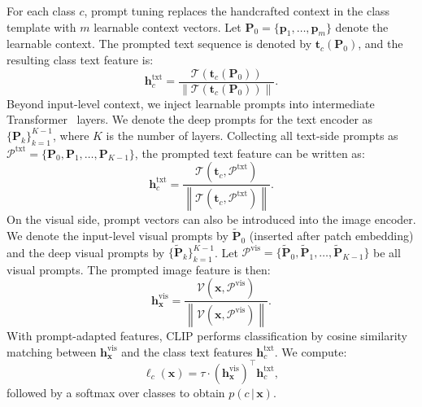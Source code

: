 \documentclass{article}
\theoremstyle{plain}
\theoremstyle{definition}
\theoremstyle{remark}
\begin{document}
	For each class $c$, prompt tuning replaces the handcrafted context in the class template with $m$ learnable context vectors.
	Let $\mathbf{P}_0=\{\mathbf{p}_1,\dots,\mathbf{p}_m\}$ denote the learnable context. The prompted text sequence is denoted by $\mathbf{t}_c(\mathbf{P}_0)$, and the resulting class text feature is:
	\begin{equation}
		\label{eq:text_prompt_shallow}
		\mathbf{h}^{\mathrm{txt}}_{c}
		=\frac{\mathcal{T}\!\left(\mathbf{t}_c(\mathbf{P}_0)\right)}{\left\|\mathcal{T}\!\left(\mathbf{t}_c(\mathbf{P}_0)\right)\right\|}.
	\end{equation}
	Beyond input-level context, we inject learnable prompts into intermediate Transformer~\citep{vaswani2017attention} layers. We denote the deep prompts for the text encoder as $\{\mathbf{P}_{k}\}_{k=1}^{K-1}$, where $K$ is the number of layers.
	Collecting all text-side prompts as $\mathcal{P}^{\mathrm{txt}}=\{\mathbf{P}_0,\mathbf{P}_1,\dots,\mathbf{P}_{K-1}\}$, the prompted text feature can be written as:
	\begin{equation}
		\label{eq:text_prompt}
		\mathbf{h}^{\mathrm{txt}}_{c}
		=\frac{\mathcal{T}\!\left(\mathbf{t}_c,\mathcal{P}^{\mathrm{txt}}\right)}{\left\|\mathcal{T}\!\left(\mathbf{t}_c,\mathcal{P}^{\mathrm{txt}}\right)\right\|}.
	\end{equation}
	On the visual side, prompt vectors can also be introduced into the image encoder. We denote the input-level visual prompts by $\tilde{\mathbf{P}}_0$ (inserted after patch embedding) and the deep visual prompts by $\{\tilde{\mathbf{P}}_{k}\}_{k=1}^{K-1}$.
	Let $\mathcal{P}^{\mathrm{vis}}=\{\tilde{\mathbf{P}}_0,\tilde{\mathbf{P}}_1,\dots,\tilde{\mathbf{P}}_{K-1}\}$ be all visual prompts.
	The prompted image feature is then:
	\begin{equation}
		\label{eq:vis_prompt}
		\mathbf{h}^{\mathrm{vis}}_{\mathbf{x}}
		=\frac{\mathcal{V}\!\left(\mathbf{x},\mathcal{P}^{\mathrm{vis}}\right)}{\left\|\mathcal{V}\!\left(\mathbf{x},\mathcal{P}^{\mathrm{vis}}\right)\right\|}.
	\end{equation}
	With prompt-adapted features, CLIP performs classification by cosine similarity matching between $\mathbf{h}^{\mathrm{vis}}_{\mathbf{x}}$ and the class text features $\mathbf{h}^{\mathrm{txt}}_{c}$. We compute:
	\begin{equation}
		\ell_c(\mathbf{x})=\tau \cdot \left( \mathbf{h}^{\mathrm{vis}}_{\mathbf{x}} \right)^{\top} \mathbf{h}^{\mathrm{txt}}_{c},
	\end{equation}
	followed by a softmax over classes to obtain $p(c\,|\,\mathbf{x})$.
	
\end{document}
